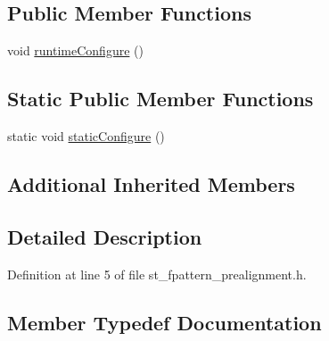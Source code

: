 \subsection*{Public Member Functions}
\begin{DoxyCompactItemize}
\item 
void \hyperlink{structsm__dance__bot__strikes__back_1_1StFpatternPrealignment_a12d2806c617371082410914de7444238}{runtime\+Configure} ()
\end{DoxyCompactItemize}
\subsection*{Static Public Member Functions}
\begin{DoxyCompactItemize}
\item 
static void \hyperlink{structsm__dance__bot__strikes__back_1_1StFpatternPrealignment_a174f61be56796e4124aad1f97a49cb26}{static\+Configure} ()
\end{DoxyCompactItemize}
\subsection*{Additional Inherited Members}


\subsection{Detailed Description}


Definition at line 5 of file st\+\_\+fpattern\+\_\+prealignment.\+h.



\subsection{Member Typedef Documentation}
\mbox{\label{structsm__dance__bot__strikes__back_1_1StFpatternPrealignment_a2954d92b15e04cee07bd0a5172df7f59}} 
